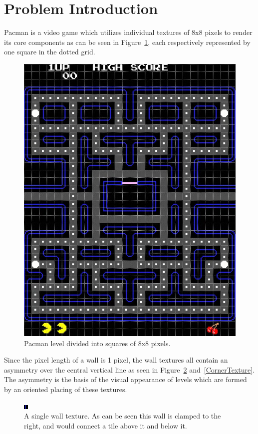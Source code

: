 \section{Problem Introduction}
Pacman is a video game which utilizes individual textures of 8x8 pixels to render its core components as can be seen in Figure~\ref{PacmanLevelGrid}, each respectively represented by one square in the dotted grid.

\begin{figure}[H]
\centering
\includegraphics[width=0.4\linewidth]{Image-1.jpg}
\caption {Pacman level divided into squares of 8x8 pixels.\autocite{pittman_pac-man_2009}}\label{PacmanLevelGrid}
\end{figure}

Since the pixel length of a wall is 1 pixel, the wall textures all contain an asymmetry over the central vertical line as seen in Figure~\ref{StraightWallTexture} and~\ref{CornerTexture}. The asymmetry is the basis of the visual appearance of levels which are formed by an oriented placing of these textures. 

\begin{figure}[H]
\centering
\includegraphics[width=0.4\linewidth]{Image-2.png}
\caption {A single wall texture. As can be seen this wall is clamped to the right, and would connect a tile above it and below it.\autocite{myself}}\label{StraightWallTexture}
\end{figure}

